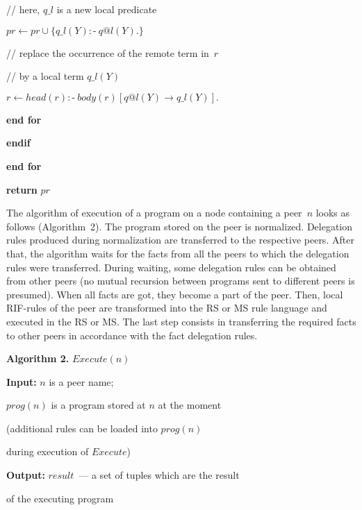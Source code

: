 \begin{multicols}{2}
\hspace*{6mm}// here, $q\_l$ is a new local predicate

  \hspace*{6mm}$pr \leftarrow pr \cup \{ q\_l(Y):\!\mbox{-}\ q@l(Y).\}$

  \hspace*{6mm}// replace the occurrence of the remote term in~$r$

\hspace*{6mm}// by a local term $q\_l(Y)$

  \hspace*{6mm}$r \leftarrow head(r) :\!\mbox{-}\ body(r)[q@l(Y)\rightarrow
q\_l(Y)].$

  \hspace*{3mm}\textbf{end for}

  \hspace*{1mm}\textbf{endif}


\noindent
\textbf{end for}

\noindent
  \textbf{return} $pr$

  \smallskip

  The algorithm of execution of a program on a node containing a peer~$n$ looks as
follows (Algorithm~2). The program stored on the peer is normalized. Delegation
rules produced during normalization are transferred to the respective peers. After that,
the algorithm waits for the facts from all the peers to which the delegation rules were
transferred. During waiting, some delegation rules can be obtained from other peers
(no mutual recursion between programs sent to different peers is presumed). When all
facts are got, they become a part of the peer. Then, local RIF-rules of the peer are
transformed into the RS or MS rule language and executed in the RS or MS. The last
step consists in transferring the required facts to other peers in accordance with the
fact delegation rules.

\noindent
  \textbf{Algorithm 2.} $Execute(n)$


\noindent
\textbf{Input:} $n$ is a peer name;

$prog(n)$ is a program stored at $n$ at the moment

(additional rules can be loaded into $prog(n)$

during execution of $Execute$)

  \noindent
  \textbf{Output:} $result$~--- a set of tuples which are the result
  
  \hspace*{1mm}of the executing program


\end{multicols}

